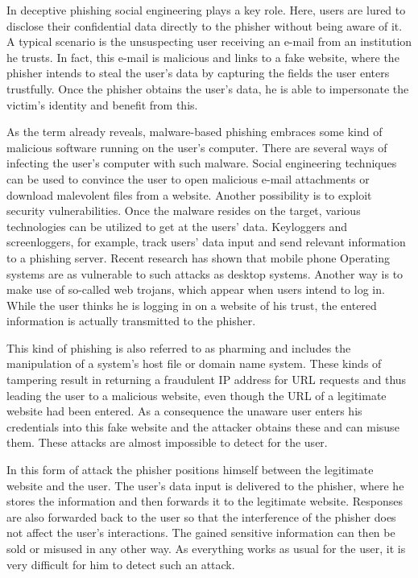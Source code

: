 \begin{description}[leftmargin=0cm]
	\item[Deceptive Phishing] In deceptive phishing social engineering plays a key role.
 Here, users are lured to disclose their confidential data directly to the phisher without being aware of it.
 A typical scenario is the unsuspecting user receiving an e-mail from an institution he trusts.
 In fact, this e-mail is malicious and links to a fake website, where the phisher intends to steal the user's data by capturing the fields the user enters trustfully.
 Once the phisher obtains the user's data, he is able to impersonate the victim's identity and benefit from this.

	\item[Malware-Based Phishing] As the term already reveals, malware-based phishing embraces some kind of malicious software running on the user's computer.
 There are several ways of infecting the user's computer with such malware.
 Social engineering techniques can be used to convince the user to open malicious e-mail attachments or download malevolent files from a website.
 Another possibility is to exploit security vulnerabilities.
 Once the malware resides on the target, various technologies can be utilized to get at the users' data.
 Keyloggers and screenloggers, for example, track users' data input and send relevant information to a phishing server.
 Recent research has shown that mobile phone Operating systems are as vulnerable to such attacks as desktop systems.
 Another way is to make use of so-called web trojans, which appear when users intend to log in.
 While the user thinks he is logging in on a website of his trust, the entered information is actually transmitted to the phisher.

	\item[DNS Based Phishing] This kind of phishing is also referred to as pharming and includes the manipulation of a system's host file or domain name system.
 These kinds of tampering result in returning a fraudulent IP address for URL requests and thus leading the user to a malicious website, even though the URL of a legitimate website had been entered.
 As a consequence the unaware user enters his credentials into this fake website and the attacker obtains these and can misuse them.
 These attacks are almost impossible to detect for the user.

	\item[Man-in-the-Middle Phishing] In this form of attack the phisher positions himself between the legitimate website and the user.
 The user's data input is delivered to the phisher, where he stores the information and then forwards it to the legitimate website.
 Responses are also forwarded back to the user so that the interference of the phisher does not affect the user's interactions.
 The gained sensitive information can then be sold or misused in any other way.
 As everything works as usual for the user, it is very difficult for him to detect such an attack.
 

\end{description}
